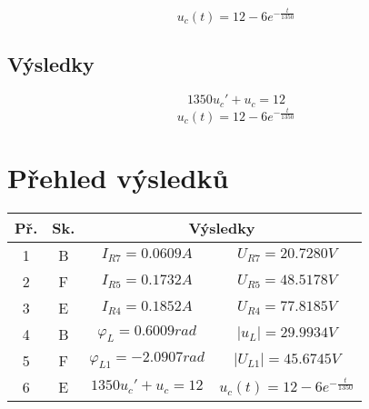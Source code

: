 \documentclass[12pt,a4paper,titlepage,final]{article}
\begin{document}
\begin{equation}\label{eq6:dosazeni}
u_c(t)= 12-6e^{-\frac{t}{1350}}
\end{equation}
\subsection{Výsledky}
\[1350u_c'+u_c=12\]
\[u_c(t)= 12-6e^{-\frac{t}{1350}}\]

\section{Přehled výsledků}

\begin{tabular}{|c|c|c|c|}
\hline
Př. & Sk. & \multicolumn{2}{|c|}{Výsledky}\\
\hline
1 & B & $I_{R7} = 0.0609A$ & $U_{R7} = 20.7280V$\\
\hline
2 & F & $I_{R5} = 0.1732A$ & $U_{R5} = 48.5178V$\\
\hline
3 & E & $I_{R4} = 0.1852A$ & $U_{R4} = 77.8185V$\\
\hline
4 & B & $\varphi_L = 0.6009rad$ & $|u_L| = 29.9934V$\\
\hline
5 & F & $\varphi_{L1} = -2.0907rad$ & $|U_{L1}| = 45.6745V$\\
\hline
6 & E & $1350u_c'+u_c=12$ & $u_c(t)= 12-6e^{-\frac{t}{1350}}$\\
\hline
\end{tabular}
\end{document}
